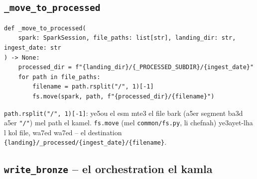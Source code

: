 \documentclass[11pt,a4paper]{report}
\DeclareRobustCommand{\code}[1]{\texttt{#1}}
\begin{document}
\subsection{\code{\_move\_to\_processed}}

\begin{lstlisting}[style=pystyle]
def _move_to_processed(
    spark: SparkSession, file_paths: list[str], landing_dir: str, ingest_date: str
) -> None:
    processed_dir = f"{landing_dir}/{_PROCESSED_SUBDIR}/{ingest_date}"
    for path in file_paths:
        filename = path.rsplit("/", 1)[-1]
        fs.move(spark, path, f"{processed_dir}/{filename}")
\end{lstlisting}

\code{path.rsplit("/", 1)[-1]}: ye5ou el esm mte3 el file bark (a5er
segment ba3d a5er \code{"/"}) mel path el kamel. \code{fs.move} (mel
\code{common/fs.py}, li chefnah) ye3ayet-lha l kol file, wa7ed wa7ed --
el destination \code{\{landing\}/\_processed/\{ingest\_date\}/\{filename\}}.

\subsection{\code{write\_bronze} -- el orchestration el kamla}
\end{document}
